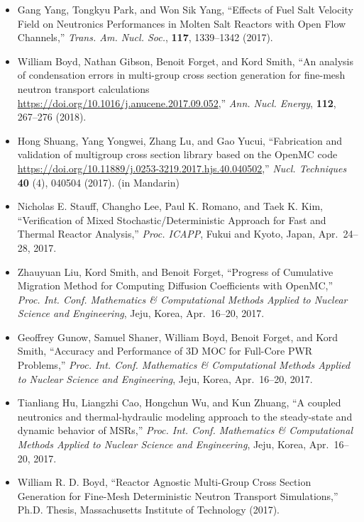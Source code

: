 \begin{itemize}
\item Gang Yang, Tongkyu Park, and Won Sik Yang, ``Effects of Fuel Salt Velocity
Field on Neutronics Performances in Molten Salt Reactors with Open Flow
Channels,'' \textit{Trans. Am. Nucl. Soc.}, \textbf{117}, 1339--1342 (2017).

\item William Boyd, Nathan Gibson, Benoit Forget, and Kord Smith, ``An analysis of
condensation errors in multi-group cross section generation for fine-mesh
neutron transport calculations
\url{https://doi.org/10.1016/j.anucene.2017.09.052},'' \textit{Ann. Nucl. Energy},
\textbf{112}, 267--276 (2018).

\item Hong Shuang, Yang Yongwei, Zhang Lu, and Gao Yucui, ``Fabrication and
validation of multigroup cross section library based on the OpenMC code
\url{https://doi.org/10.11889/j.0253-3219.2017.hjs.40.040502},''
\textit{Nucl. Techniques} \textbf{40} (4), 040504 (2017). (in Mandarin)

\item Nicholas E. Stauff, Changho Lee, Paul K. Romano, and Taek K. Kim,
``Verification of Mixed Stochastic/Deterministic Approach for Fast and Thermal
Reactor Analysis,'' \textit{Proc. ICAPP}, Fukui and Kyoto, Japan, Apr.\ 24--28, 2017.

\item Zhauyuan Liu, Kord Smith, and Benoit Forget, ``Progress of Cumulative Migration
Method for Computing Diffusion Coefficients with OpenMC,''
\textit{Proc. Int. Conf. Mathematics \& Computational Methods Applied to Nuclear
Science and Engineering}, Jeju, Korea, Apr.\ 16--20, 2017.

\item Geoffrey Gunow, Samuel Shaner, William Boyd, Benoit Forget, and Kord Smith,
``Accuracy and Performance of 3D MOC for Full-Core PWR Problems,''
\textit{Proc. Int. Conf. Mathematics \& Computational Methods Applied to Nuclear
Science and Engineering}, Jeju, Korea, Apr.\ 16--20, 2017.

\item Tianliang Hu, Liangzhi Cao, Hongchun Wu, and Kun Zhuang, ``A coupled neutronics
and thermal-hydraulic modeling approach to the steady-state and dynamic
behavior of MSRs,'' \textit{Proc. Int. Conf. Mathematics \& Computational Methods
Applied to Nuclear Science and Engineering}, Jeju, Korea, Apr.\ 16--20, 2017.

\item William R. D. Boyd, ``Reactor Agnostic Multi-Group Cross Section Generation for
Fine-Mesh Deterministic Neutron Transport Simulations,'' Ph.D. Thesis,
Massachusetts Institute of Technology (2017).


\end{itemize}
